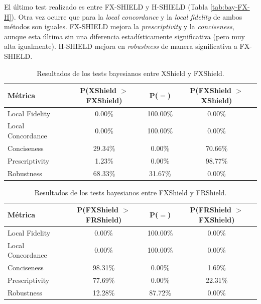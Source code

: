El último test realizado es entre FX-SHIELD y H-SHIELD (Tabla \ref{tab:bay-FX-H}). Otra vez ocurre que para la \textit{local concordance} y la \textit{local fidelity} de ambos métodos son iguales. FX-SHIELD mejora la \textit{prescriptivity} y la \textit{conciseness}, aunque esta última sin una diferencia estadísticamente significativa (pero muy alta igualmente). H-SHIELD mejora en \textit{robustness} de manera significativa a FX-SHIELD.



\begin{table}[ht]
\centering
\begin{tabular}{lccc}
\toprule
\textbf{Métrica} & \textbf{P(XShield $>$ FXShield)} & \textbf{P($=$)} & \textbf{P(FXShield $>$ XShield)} \\
\midrule
Local Fidelity    & 0.00\%  & 100.00\% & 0.00\%  \\
Local Concordance & 0.00\%  & 100.00\% & 0.00\%  \\
Conciseness       & 29.34\% & 0.00\%  & 70.66\%  \\
Prescriptivity    & 1.23\%  & 0.00\%  & 98.77\%  \\
Robustness        & 68.33\% & 31.67\% & 0.00\% \\
\bottomrule
\end{tabular}
\caption{Resultados de los tests bayesianos entre XShield y FXShield.}
\label{tab:bay-X-FX}
\end{table}

\begin{table}[ht]
\centering
\begin{tabular}{lccc}
\toprule
\textbf{Métrica} & \textbf{P(FXShield $>$ FRShield)} & \textbf{P($=$)} & \textbf{P(FRShield $>$ FXShield)} \\
\midrule
Local Fidelity    & 0.00\%  & 100.00\% & 0.00\%  \\
Local Concordance & 0.00\%  & 100.00\% & 0.00\%  \\
Conciseness       & 98.31\% & 0.00\%  & 1.69\%  \\
Prescriptivity    & 77.69\% & 0.00\%  & 22.31\%  \\
Robustness        & 12.28\% & 87.72\% & 0.00\% \\
\bottomrule
\end{tabular}
\caption{Resultados de los tests bayesianos entre FXShield y FRShield.}
\label{tab:bay-FX-FR}
\end{table}


